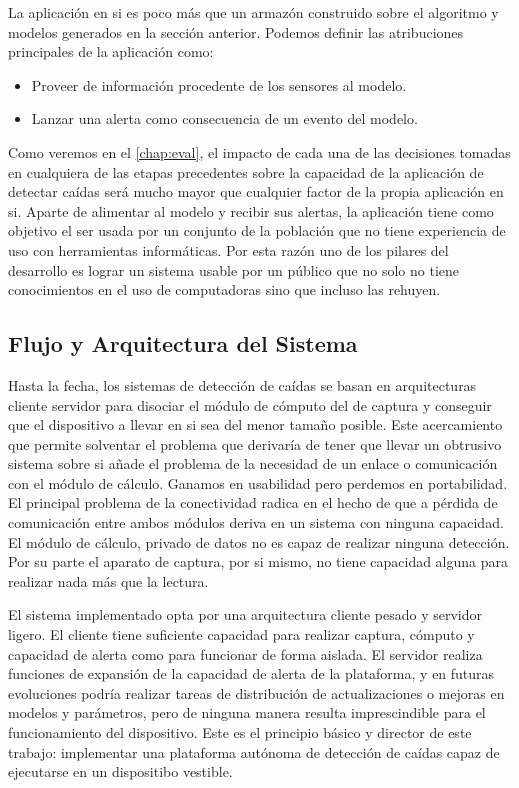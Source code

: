 La aplicación en si es poco más que un armazón construido sobre el algoritmo y modelos generados en la sección anterior. Podemos definir las atribuciones principales de la aplicación como:
\begin{itemize}
  \item Proveer de información procedente de los sensores al modelo.
  \item Lanzar una alerta como consecuencia de un evento del modelo.
\end{itemize}

Como veremos en el \autoref{chap:eval}, el impacto de cada una de las decisiones tomadas en cualquiera de las etapas precedentes sobre la capacidad de la aplicación de detectar caídas será mucho mayor que cualquier factor de la propia aplicación en si. Aparte de alimentar al modelo y recibir sus alertas, la aplicación tiene como objetivo el ser usada por un conjunto de la población que no tiene experiencia de uso con herramientas informáticas. Por esta razón uno de los pilares del desarrollo es lograr un sistema usable por un público que no solo no tiene conocimientos en el uso de computadoras sino que incluso las rehuyen.


\subsection{Flujo y Arquitectura del Sistema}
Hasta la fecha, los sistemas de detección de caídas se basan en arquitecturas cliente servidor para disociar el módulo de cómputo del de captura y conseguir que el dispositivo a llevar en si sea del menor tamaño posible. Este acercamiento que permite solventar el problema que derivaría de tener que llevar un obtrusivo sistema sobre si añade el problema de la necesidad de un enlace o comunicación con el módulo de cálculo. Ganamos en usabilidad pero perdemos en portabilidad. El principal problema de la conectividad radica en el hecho de que a pérdida de comunicación entre ambos módulos deriva en un sistema con ninguna capacidad. El módulo de cálculo, privado de datos no es capaz de realizar ninguna detección. Por su parte el aparato de captura, por si mismo, no tiene capacidad alguna para realizar nada más que la lectura.

El sistema implementado opta por una arquitectura cliente pesado y servidor ligero. El cliente tiene suficiente capacidad para realizar captura, cómputo y capacidad de alerta como para funcionar de forma aislada. El servidor realiza funciones de expansión de la capacidad de alerta de la plataforma, y en futuras evoluciones podría realizar tareas de distribución de actualizaciones o mejoras en modelos y parámetros, pero de ninguna manera resulta imprescindible para el funcionamiento del dispositivo. Este es el principio básico y director de este trabajo: implementar una plataforma autónoma de detección de caídas capaz de ejecutarse en un dispositibo vestible.

